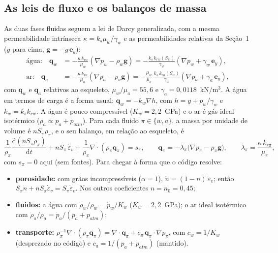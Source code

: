 \documentclass[11pt,a4paper]{article}
\begin{document}
\subsection{As leis de fluxo e os balanços de massa}\label{sec:fluxo}
As duas fases fluidas seguem a lei de Darcy generalizada, com a mesma permeabilidade intrínseca
$\kappa = k_s\mu_w/\gamma_w$ e as permeabilidades relativas da Seção~1 ($y$ para cima, $\mathbf g = -g\,\mathbf e_y$):
\begin{align}
\text{água:}\quad \mathbf q_w &= -\frac{\kappa\,k_{rw}}{\mu_w}\left(\nabla p_w - \rho_w\mathbf g\right)
  = -\frac{k_s\,k_{rw}(S_w)}{\gamma_w}\left(\nabla p_w + \gamma_w\,\mathbf e_y\right),\\
\text{ar:}\quad \mathbf q_a &= -\frac{\kappa\,k_{ra}}{\mu_a}\left(\nabla p_a - \rho_a\mathbf g\right)
  = -\frac{\mu_w}{\mu_a}\,\frac{k_s\,k_{ra}(S_w)}{\gamma_w}\left(\nabla p_a + \gamma_a\,\mathbf e_y\right),
\end{align}
com $\mathbf q_w$ e $\mathbf q_a$ relativos ao esqueleto, $\mu_w/\mu_a = 55{,}6$ e $\gamma_a = 0{,}0118$~kN/m$^3$. A
água em termos de carga é a forma usual: $\mathbf q_w = -k_w\nabla h$, com $h = y + p_w/\gamma_w$ e $k_w = k_s
k_{rw}$. A água é pouco compressível ($K_w = 2{,}2$~GPa) e o ar é gás ideal isotérmico ($\rho_a \propto p_a + p_{atm}$).
Para cada fluido $\pi\in\{w,a\}$, a massa por unidade de volume é $nS_\pi\rho_\pi$, e o seu balanço, em relação ao
esqueleto, é
\begin{equation}
\frac{1}{\rho_\pi}\frac{\mathrm d(nS_\pi\rho_\pi)}{\mathrm dt}+nS_\pi\,\dot\varepsilon_v
+\frac{1}{\rho_\pi}\nabla\!\cdot(\rho_\pi\mathbf q_\pi)=s_\pi,
\qquad
\mathbf q_\pi=-\lambda_\pi\big(\nabla p_\pi-\rho_\pi\mathbf g\big),\qquad \lambda_\pi = \frac{\kappa\,k_{r\pi}}{\mu_\pi},
\label{eq:massa-fase}
\end{equation}
com $s_\pi = 0$ aqui (sem fontes). Para chegar à forma que o código resolve:
\begin{itemize}
  \item \textbf{porosidade:} com grãos incompressíveis ($\alpha = 1$), $\dot n = (1-n)\,\dot\varepsilon_v$; então
    $S_\pi\dot n + nS_\pi\dot\varepsilon_v = S_\pi\dot\varepsilon_v$. Nos outros coeficientes $n = n_0 = 0{,}45$;
  \item \textbf{fluidos:} a água com $\dot\rho_w/\rho_w = \dot p_w/K_w$ ($K_w = 2{,}2$~GPa); o ar ideal isotérmico com
    $\dot\rho_a/\rho_a = \dot p_a/(p_a + p_{atm})$;
  \item \textbf{transporte:} $\rho_\pi^{-1}\nabla\!\cdot(\rho_\pi\mathbf q_\pi) = \nabla\!\cdot\mathbf q_\pi +
    c_\pi\,\mathbf q_\pi\cdot\nabla p_\pi$, com $c_w = 1/K_w$ (desprezado no código) e $c_a = 1/(p_a + p_{atm})$
    (mantido).
\end{itemize}
\end{document}
